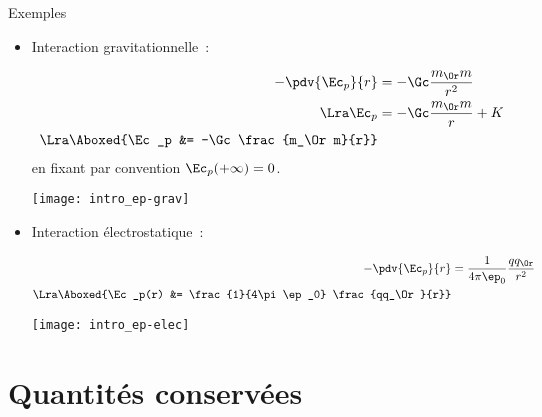 \documentclass[../main/main.tex]{subfiles}
\begin{document}
\begin{rexem}{Exemples}
    \begin{itemize}
        \item Interaction gravitationnelle~: \smallbreak
            \begin{minipage}{0.45\linewidth}
                \begin{align*}
                    -\pdv{\Ec_p}{r} &= -\Gc \frac{m_\Or m}{r^2}
                    \\\Lra
                    \Ec_p &= -\Gc \frac{m_\Or m}{r} + K
                    \\\Lra
                    \Aboxed{\Ec_p &= -\Gc \frac{m_\Or m}{r}}
                \end{align*}
                en fixant par convention $\Ec_p(+\infty) = 0$.
            \end{minipage}
            \hfill
            \begin{minipage}{0.45\linewidth}
                \begin{center}
                    \texttt{[image: intro\_ep-grav]}
                \end{center}
            \end{minipage}
        \item Interaction électrostatique~: \smallbreak
            \begin{minipage}{0.45\linewidth}
                \begin{align*}
                    -\pdv{\Ec_p}{r} &= \frac{1}{4\pi\ep_0} \frac{qq_\Or}{r^2}
                    \\\Lra
                    \Aboxed{\Ec_p(r) &= \frac{1}{4\pi\ep_0} \frac{qq_\Or}{r}}
                \end{align*}
            \end{minipage}
            \hfill
            \begin{minipage}{0.45\linewidth}
                \begin{center}
                    \texttt{[image: intro\_ep-elec]}
                \end{center}
            \end{minipage}
    \end{itemize}
\end{rexem}

\section{Quantités conservées}
\end{document}

